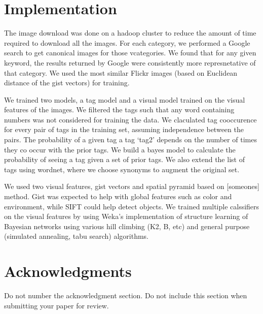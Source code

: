 \documentclass[12pt]{article}
\begin{document}
\section{Implementation}
The image download was done on a hadoop cluster to reduce the amount of time
required to download all the images.
For each category, we performed a Google search to get canonical images for
those vcategories. We found that for any given keyword, the results returned
by Google were consistently more represnetative of that category. We used the
most similar Flickr images (based on Euclidean distance of the gist vectors)
for training.

We trained two models, a tag model and a visual model trained on the visual
features of the images. We filtered the tags such that any word containing
numbers was not considered for training the data. We claculated tag
cooccurence for every pair of tags in the training set, assuming independence
between the pairs. The probability of a given tag  a tag `tag2' depends
on the number of times they co occur with the prior tags. We build a bayes model to calculate the
probability of seeing a tag given a set of prior tags. We also extend the list
of tags using wordnet, where we choose synonyms to augment the original set.

We used two visual features, gist vectors and spatial pyramid based on
[someones] method. Gist was expected to help with global features such as
color and environment, while SIFT could help detect objects. We trained multiple
calssifiers on the visual features by using Weka's implementation of structure
learning of Bayesian networks using various hill climbing (K2, B, etc) and
general purpose (simulated annealing, tabu search) algorithms.


\section*{Acknowledgments}

Do not number the acknowledgment section. Do not include this section
when submitting your paper for review.


\end{document}
